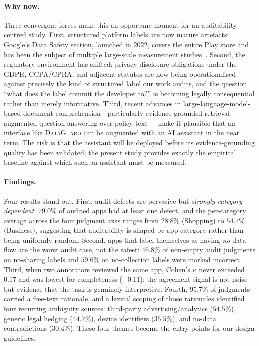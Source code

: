 \documentclass[11pt,a4paper]{article}
\newcommand{\dataguard}{\textsc{DataGuard}}
\begin{document}
\paragraph{Why now.}
Three convergent forces make this an opportune moment for an
auditability-centred study. First, structured platform labels are now
mature artefacts: Google's Data Safety section, launched in $2022$,
covers the entire Play store and has been the subject of multiple
large-scale measurement
studies~\citep{khandelwal2024unpacking,khandelwal2023comparing}. Second,
the regulatory environment has shifted: privacy-disclosure obligations
under the GDPR, CCPA/CPRA, and adjacent statutes are now being
operationalised against precisely the kind of structured label our work
audits, and the question ``what does the label commit the developer
to?'' is becoming legally consequential rather than merely informative.
Third, recent advances in large-language-model-based document
comprehension---particularly evidence-grounded retrieval-augmented
question answering over policy
text~\citep{ravichander2019question,ahmad2021intent}---make it plausible
that an interface like \dataguard{} can be augmented with an AI
assistant in the near term. The risk is that the assistant will be
deployed before its evidence-grounding quality has been validated; the
present study provides exactly the empirical baseline against which
such an assistant must be measured.

\paragraph{Findings.}
Four results stand out. First, audit defects are pervasive but
\emph{strongly category-dependent}: $79.0\%$ of audited apps had at
least one defect, and the per-category average across the four
judgment axes ranges from $28.8\%$ (Shopping) to $54.7\%$ (Business),
suggesting that auditability is shaped by app category
rather than being uniformly random. Second, apps that label themselves as
having \emph{no} data flow are the worst audit case, not the safest:
$46.8\%$ of non-empty audit judgments on no-sharing labels and $59.6\%$ on
no-collection labels were marked incorrect. Third, when two annotators
reviewed the same app, Cohen's $\kappa$ never exceeded $0.17$ and was
lowest for completeness ($-0.11$); the agreement signal is not noise but
evidence that the task is genuinely interpretive. Fourth, $95.7\%$ of
judgments carried a free-text rationale, and a lexical scoping of those
rationales identified four recurring ambiguity sources: third-party
advertising/analytics ($54.5\%$), generic legal hedging ($44.7\%$), device
identifiers ($35.5\%$), and no-data contradictions ($30.4\%$). These four
themes become the entry points for our design guidelines.
\end{document}
